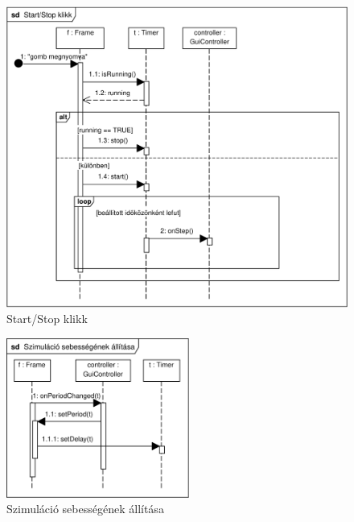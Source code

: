 \begin{figure}[H]
\begin{center}
\includegraphics[width=17cm]{chapters/chapter11/pdfs/11_startstop.pdf}
\caption{Start/Stop klikk}
\label{fig:startstop}
\end{center}
\end{figure}

\begin{figure}[H]
\begin{center}
\includegraphics[width=6cm]{chapters/chapter11/pdfs/12_szimseb.pdf}
\caption{Szimuláció sebességének állítása}
\label{fig:szimseb}
\end{center}
\end{figure}